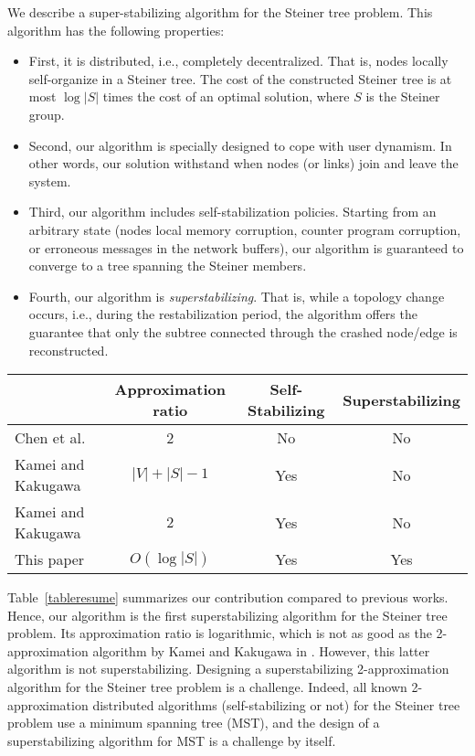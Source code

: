 \documentclass[11pt]{article}
\begin{document}
We describe a super-stabilizing algorithm for the Steiner tree problem. This algorithm has the following properties:
\begin{itemize}
\item First, it is distributed, i.e.,  completely decentralized. That is, nodes
locally self-organize in a Steiner tree. The cost of the constructed Steiner tree 
is at most $\log |S|$ times the cost of an optimal solution, where $S$ is the Steiner group. 
\item Second, our algorithm is specially designed to cope with user
dynamism. In other words, 
our solution withstand when nodes (or links) join and leave the system. 
\item Third, our algorithm includes self-stabilization policies. Starting from an arbitrary state (nodes local memory corruption, counter program corruption, or
erroneous messages in the network buffers), our algorithm is guaranteed to converge to a tree spanning the Steiner members. 
\item Fourth, our algorithm is \emph{superstabilizing}. That is, while
a topology change occurs, i.e., during the restabilization period,
 the algorithm offers the guarantee that only the subtree connected
through the crashed node/edge is reconstructed. 
\end{itemize}

\begin{table*}[!htb]
\begin{center}
\scalebox{1}
{
\begin{tabular}{|l|c|c|c|}
\hline
 & Approximation ratio & Self-Stabilizing & Superstabilizing \\
\hline
Chen et al. \cite{ChenHK93} & 2 & No & No \\
Kamei and Kakugawa \cite{SS_Steiner02} & $|V|+|S|-1$ & Yes & No \\
Kamei and Kakugawa \cite{Kakugawa_Steiner_journal} & $2$ & Yes & No \\
\hline
This paper &  $O(\log |S|)$ & Yes & Yes \\
\hline
\end{tabular}
}
\caption{Distributed (deterministic) algorithms for the Steiner tree problem.}
\label{tableresume}
\end{center}
\end{table*}

Table~\ref{tableresume} summarizes our contribution compared to
previous works. Hence, our algorithm is the first superstabilizing
algorithm for the Steiner tree problem. Its approximation ratio is
logarithmic, which is not as good as the 2-approximation algorithm by
Kamei and Kakugawa in \cite{Kakugawa_Steiner_journal}. However, this
latter algorithm is not superstabilizing. Designing a superstabilizing
2-approximation algorithm for the Steiner tree problem is a
challenge. Indeed, all known 2-approximation distributed algorithms
(self-stabilizing or not) for the Steiner tree problem use a minimum
spanning tree (MST), and the design of a superstabilizing algorithm
for MST is a challenge by itself.
\end{document}
